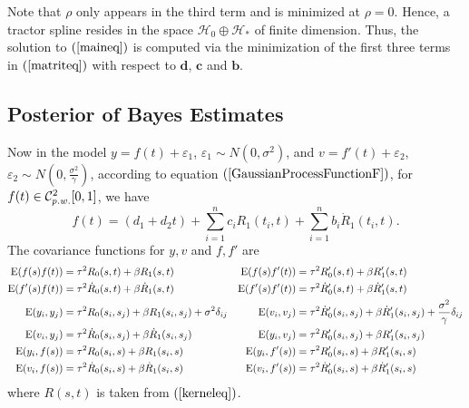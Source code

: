 Note that $\rho$ only appears in the third term and is minimized at $\rho=0$. Hence, a tractor spline resides in the space $\mathcal{H}_0\oplus \mathcal{H}_*$ of finite dimension. Thus, the solution to $(\ref{maineq})$ is computed via the minimization of the first three terms in $(\ref{matriteq})$ with respect to $\mathbf{d}$, $\mathbf{c}$ and $\mathbf{b}$.



\subsection{Posterior of Bayes Estimates}


Now in the model $y=f(t)+\varepsilon_1$, $\varepsilon_1 \sim N(0,\sigma^2)$, and $v=f '(t)+\varepsilon_2$, $\varepsilon_2\sim N(0, \frac{\sigma^2}{\gamma})$, according to equation $(\ref{GaussianProcessFunctionF})$, for $f(t) \in \mathcal{C}_{\footnotesize p.w.}^{2}[0,1]$, we have 
\begin{equation}
f(t)=(d_1+d_2t)+\sum_{i=1}^{n}c_iR_1(t_i,t)+\sum_{i=1}^{n}b_i\dot{R}_1(t_i,t).
\end{equation}
The covariance functions for $y,v$ and $f , f '$ are
\begin{align*}
\mathrm{E} (f(s)f (t))&=\tau^2R_0(s,t)+\beta R_1(s,t) & \mathrm{E} (f(s)f '(t))&=\tau^2R_0'(s,t)+\beta R_1'(s,t) \\
\mathrm{E} (f '(s)f (t))&=\tau^2\dot{R}_0(s,t)+\beta\dot{R}_1(s,t) & \mathrm{E} (f '(s)f '(t))&=\tau^2\dot{R}'_0(s,t)+\beta\dot{R}'_1(s,t) \\
\footnotesize \mathrm{E} (y_i,y_j)&=\tau^2R_0(s_i,s_j)+\beta R_1(s_i,s_j)+\sigma^2\delta_{ij}   & 
\mathrm{E} (v_i,v_j)&=\tau^2\dot{R}'_0(s_i,s_j)+\beta\dot{R}'_1(s_i,s_j) +\frac{\sigma^2}{\gamma}\delta_{ij} \\ 
\normalsize
\mathrm{E} (v_i,y_j)&=\tau^2\dot{R}_0(s_i,s_j)+\beta \dot{R}_1(s_i,s_j) &
\mathrm{E} (y_i,v_j)&=\tau^2R_0'(s_i,s_j)+\beta R_1'(s_i,s_j)\\
\mathrm{E} (y_i,f(s))&=\tau^2 R_0(s_i,s)+\beta R_1(s_i,s)  & \mathrm{E} (y_i,f '(s))&=\tau^2 R'_0(s_i,s)+\beta R'_1(s_i,s)  \\
\mathrm{E} (v_i,f(s))&=\tau^2 \dot{R}_0(s_i,s)+\beta \dot{R}_1(s_i,s) & \mathrm{E} (v_i,f '(s))&=\tau^2\dot{R}'_0(s_i,s)+\beta \dot{R}'_1(s_i,s)
\end{align*}
where $R(s,t)$ is taken from $(\ref{kerneleq})$. 


